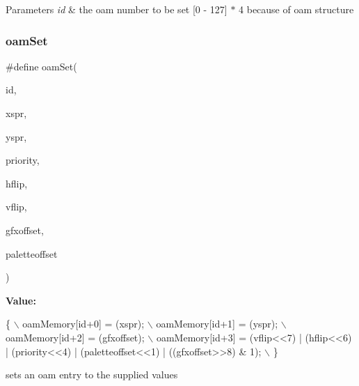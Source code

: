 \begin{DoxyParams}{Parameters}
{\em id} & the oam number to be set \mbox{[}0 -\/ 127\mbox{]} $\ast$ 4 because of oam structure \\
\hline
\end{DoxyParams}
\mbox{\label{a00365_a2f62a591672b786d90ebb03fdf25f159}} 
\subsubsection{\texorpdfstring{oam\+Set}{oamSet}}
{\footnotesize\ttfamily \#define oam\+Set(\begin{DoxyParamCaption}\item[{}]{id,  }\item[{}]{xspr,  }\item[{}]{yspr,  }\item[{}]{priority,  }\item[{}]{hflip,  }\item[{}]{vflip,  }\item[{}]{gfxoffset,  }\item[{}]{paletteoffset }\end{DoxyParamCaption})}

{\bfseries Value\+:}
\begin{DoxyCode}
\{ \(\backslash\)
    oamMemory[\textcolor{keywordtype}{id}+0] = (xspr); \(\backslash\)
    oamMemory[\textcolor{keywordtype}{id}+1] = (yspr); \(\backslash\)
    oamMemory[\textcolor{keywordtype}{id}+2] = (gfxoffset); \(\backslash\)
    oamMemory[\textcolor{keywordtype}{id}+3] = (vflip<<7) | (hflip<<6) | (priority<<4) | (paletteoffset<<1) | ((gfxoffset>>8) & 1); 
      \(\backslash\)
    \}
\end{DoxyCode}


sets an oam entry to the supplied values 


